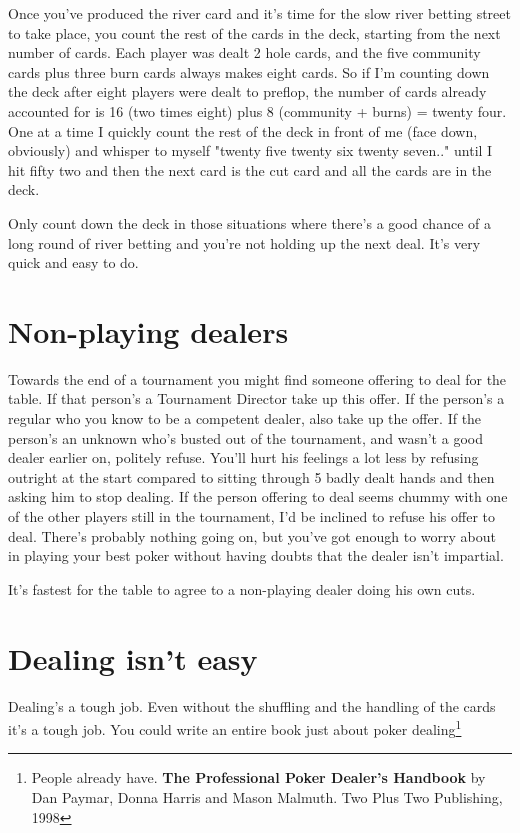 Once you've produced the river card and it's time for the slow
river betting street to take place, you count the rest of the
cards in the deck, starting from the next number of cards.
Each player was dealt 2 hole cards, and the five community
cards plus three burn cards always makes eight cards. So if
I'm counting down the deck after eight players were dealt
to preflop, the number of cards already accounted for is
16 (two times eight) plus 8 (community + burns) = twenty four.
One at a time I quickly count the rest of the deck in front
of me (face down, obviously) and whisper to myself
"twenty five twenty six twenty seven.." until I hit fifty two
and then the next card is the cut card and all the cards
are in the deck.

Only count down the deck in those situations where there's
a good chance of a long round of river betting and you're
not holding up the next deal. It's very quick and easy to
do.

\section{Non-playing dealers}

Towards the end of a tournament you might find someone offering
to deal for the table. If that person's a Tournament Director
take up this offer. If the person's a
regular who you know to be a competent dealer, also take up
the offer. If the person's an unknown who's busted out of the
tournament, and wasn't a good dealer earlier on, politely
refuse. You'll hurt his feelings a lot less by refusing outright
at the start compared to sitting through 5 badly dealt hands
and then asking him to stop dealing. If the person
offering to deal seems chummy with one of the other players
still in the tournament, I'd be inclined to refuse his offer
to deal. There's probably nothing going on, but you've got
enough to worry about in playing your best poker without
having doubts that the dealer isn't impartial.

It's fastest for the table to agree to a non-playing dealer
doing his own cuts.

\section{Dealing isn't easy}

Dealing's a tough job. Even without the shuffling and the handling
of the cards it's a tough job. You could write an entire book
just about poker dealing\footnote{People already have. \textbf{The
Professional Poker Dealer's Handbook} by Dan Paymar, Donna Harris
and Mason Malmuth. Two Plus Two Publishing, 1998}

